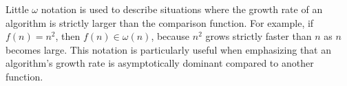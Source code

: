 Little $\omega$ notation is used to describe situations where the growth rate 
of an algorithm is strictly larger than the comparison function. For example, 
if $f(n) = n^2$, then $f(n) \in \omega(n)$, because $n^2$ grows strictly 
faster than $n$ as $n$ becomes large. This notation is particularly useful 
when emphasizing that an algorithm's growth rate is asymptotically dominant 
compared to another function.